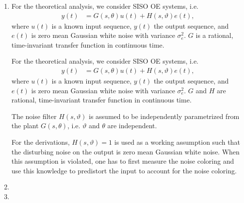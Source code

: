 \documentclass{responseletter}
\begin{document}
\begin{enumerate}

\item
{}
\begin{oldquote}
For the theoretical analysis, we consider \gls{SISO} \gls{OE} systems, i.e.
\begin{align}
y(t) &=G(s,\theta)u(t)  + H(s,\vartheta)e(t),
\end{align}
where $u(t)$ is a known input sequence, $y(t)$ the output sequence, and $e(t)$ is zero mean Gaussian white noise with variance $\sigma_{e}^2$.
$G$ is a rational, time-invariant transfer function in continuous time.
\end{oldquote}
\begin{newquote}
For the theoretical analysis, we consider \gls{SISO} \gls{OE} systems, i.e.
\begin{align}
y(t) &=G(s,\theta)u(t)  + H(s,\vartheta)e(t),
\end{align}
where $u(t)$ is a known input sequence, $y(t)$ the output sequence, and $e(t)$ is zero mean Gaussian white noise with variance $\sigma_{e}^2$.
$G$ and $H$ are rational, time-invariant transfer function in continuous time.
\omission{}
\begin{assumption}{2.1}
The noise filter $H(s,\vartheta)$ is assumed to be independently parametrized from the plant $G(s,\theta)$, i.e. $\vartheta$ and $\theta$ are independent.
\end{assumption}
\begin{assumption}{2.2}
For the derivations, $H(s,\vartheta) = 1$ is used as a working assumption such that the disturbing noise on the output is zero mean Gaussian white noise.
When this assumption is violated, one has to first measure the noise coloring and use this knowledge to predistort the input to account for the noise coloring.
\end{assumption}
\end{newquote}

\item {}
\item {}


\end{enumerate}
\end{document}
